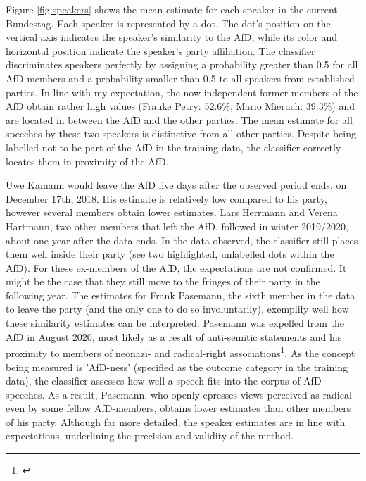 \documentclass{article}
\begin{document}
Figure \ref{fig:speakers} shows the mean estimate for each speaker in the current Bundestag. Each speaker is represented by a dot. The dot's position on the vertical axis indicates the speaker's similarity to the AfD, while its color and horizontal position indicate the speaker's party affiliation. The classifier discriminates speakers perfectly by assigning a probability greater than 0.5 for all AfD-members and a probability smaller than 0.5 to all speakers from established parties. In line with my expectation, the now independent former members of the AfD obtain rather high values (Frauke Petry: 52.6\%, Mario Mieruch: 39.3\%) and are located in between the AfD and the other parties. The mean estimate for all speeches by these two speakers is distinctive from all other parties. Despite being labelled not to be part of the AfD in the training data, the classifier correctly locates them in proximity of the AfD. \par

Uwe Kamann would leave the AfD five days after the observed period ends, on December 17th, 2018. His estimate is relatively low compared to his party, however several members obtain lower estimates. Lars Herrmann and Verena Hartmann, two other members that left the AfD, followed in winter 2019/2020, about one year after the data ends. In the data observed, the classifier still places them well inside their party (see two highlighted, unlabelled dots within the AfD). For these ex-members of the AfD, the expectations are not confirmed. It might be the case that they still move to the fringes of their party in the following year. The estimates for Frank Pasemann, the sixth member in the data to leave the party (and the only one to do so involuntarily), exemplify well how these similarity estimates can be interpreted. Pasemann was expelled from the AfD in August 2020, most likely as a result of anti-semitic statements and his proximity to members of neonazi- and radical-right associations\footnote{\cite{MDR2018Pasemann, MDR2020Pasemann}}. As the concept being measured is 'AfD-ness' (specified as the outcome category in the training data), the classifier assesses how well a speech fits into the corpus of AfD-speeches. As a result, Pasemann, who openly epresses views perceived as radical even by some fellow AfD-members, obtains lower estimates than other members of his party. Although far more detailed, the speaker estimates are in line with expectations, underlining the precision and validity of the method. \par
\end{document}
